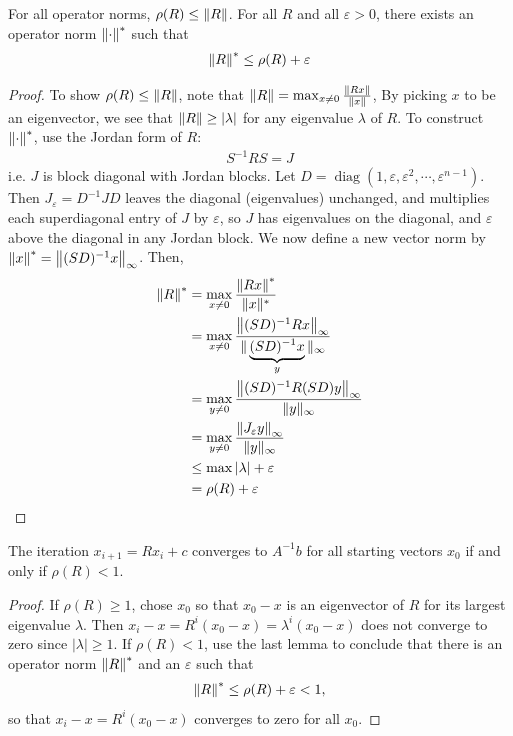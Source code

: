 \documentclass[11pt]{article}
\numberwithin{equation}{section}
\begin{document}
\begin{lemma}
    For all operator norms, $\rho(R) \leq \left\| R \right\|$. For all $R$ and all $\varepsilon>0$,
    there exists an operator norm $\left\| \cdot \right\|^*$ such that \begin{align*}
        \left\| R \right\|^* \leq \rho(R) + \varepsilon
    \end{align*}
    \begin{proof}
        To show $\rho(R) \leq \left\| R \right\|$, note that $\left\| R \right\| = \max_{x \neq 0}\frac{\left\| Rx \right\|}{\left\| x \right\|}$,
        By picking $x$ to be an eigenvector, we see that $\left\| R \right\| \geq |\lambda|$ for any eigenvalue $\lambda$ of $R$. 
        To construct $\left\| \cdot \right\|^*$, use the Jordan form of $R$:\begin{align*}
            S^{-1} R S=J
        \end{align*}
        i.e. $J$ is block diagonal with Jordan blocks. Let $D = \operatorname{diag}(1,\varepsilon,\varepsilon^2,\cdots,\varepsilon^{n-1})$. 
        Then $J_\varepsilon = D^{-1}JD$ leaves the diagonal (eigenvalues) unchanged, and multiplies each superdiagonal entry of $J$ by $\varepsilon$, so $J$ has eigenvalues on the diagonal,
        and $\varepsilon$ above the diagonal in any Jordan block. We now define a new vector norm by $\left\| x \right\|^* = \left\| (SD)^{-1}x \right\|_\infty$.
        Then, \begin{align*}
            \left\| R \right\|^* &= \max_{x \neq 0} \frac{\left\|R{x}\right\|^{*}}{\|x\|^{*}} \\
            &= \max_{x \neq 0} \frac{\left\|(SD)^{-1}R{x}\right\|_{\infty}}{\|\underbrace{(SD)^{-1}x}_{y}\|_{\infty}} \\
            &= \max_{y \neq 0} \frac{\left\|(SD)^{-1}R(SD)y\right\|_{\infty}}{\|y\|_{\infty}} \\
            &= \max_{y \neq 0} \frac{\left\|J_\varepsilon y\right\|_{\infty}}{\|y\|_{\infty}} \\
            &\leq \max |\lambda| + \varepsilon \\
            &= \rho(R) + \varepsilon
        \end{align*}
    \end{proof}
\end{lemma}

\begin{theorem}
    The iteration $x_{i+1} = Rx_i + c$ converges to $A^{-1}b$ for all starting vectors $x_0$ if and only if $\rho(R)<1$.
    \begin{proof}
        If $\rho(R) \geq 1$, chose $x_0$ so that $x_0-x$ is an eigenvector of $R$ for its largest eigenvalue $\lambda$. 
        Then $x_i-x = R^i(x_0-x) = \lambda^i (x_0-x)$ does not converge to zero since $|\lambda| \geq 1$.
        If $\rho(R) < 1$, use the last lemma to conclude that there is an operator norm $\left\| R \right\|^*$ and an $\varepsilon$ such that \begin{align*}
            \left\| R \right\|^* \leq \rho(R)+\varepsilon < 1,
        \end{align*}so that $x_i-x = R^i (x_0-x)$ converges to zero for all $x_0$.
    \end{proof}
\end{theorem}
\end{document}
